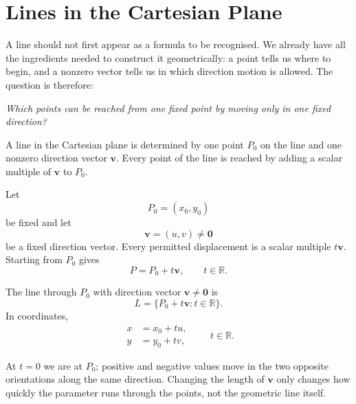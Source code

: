\section{Lines in the Cartesian Plane}

A line should not first appear as a formula to be recognised. We already have
all the ingredients needed to construct it geometrically: a point tells us where
to begin, and a nonzero vector tells us in which direction motion is allowed.
The question is therefore:

\begin{center}
\emph{Which points can be reached from one fixed point by moving only in one
fixed direction?}
\end{center}

\begin{corebox}
A line in the Cartesian plane is determined by one point $P_0$ on the line and
one nonzero direction vector $\mathbf v$. Every point of the line is reached by
adding a scalar multiple of $\mathbf v$ to $P_0$.
\end{corebox}

Let
\[
P_0=(x_0,y_0)
\]
be fixed and let
\[
\mathbf v=(u,v)\neq\mathbf0
\]
be a fixed direction vector. Every permitted displacement is a scalar multiple
$t\mathbf v$. Starting from $P_0$ gives
\[
P=P_0+t\mathbf v,
\qquad t\in\mathbb R.
\]

\begin{definitionbox}
The line through $P_0$ with direction vector $\mathbf v\neq\mathbf0$ is
\[
\boxed{
L=\{P_0+t\mathbf v:t\in\mathbb R\}.
}
\]
In coordinates,
\[
\boxed{
\begin{aligned}
x&=x_0+tu,\\
y&=y_0+tv,
\end{aligned}
\qquad t\in\mathbb R.
}
\]
\end{definitionbox}

\begin{interpretationbox}
At $t=0$ we are at $P_0$; positive and negative values move in the two opposite
orientations along the same direction. Changing the length of $\mathbf v$ only
changes how quickly the parameter runs through the points, not the geometric
line itself.
\end{interpretationbox}

\begin{center}
\end{center}

